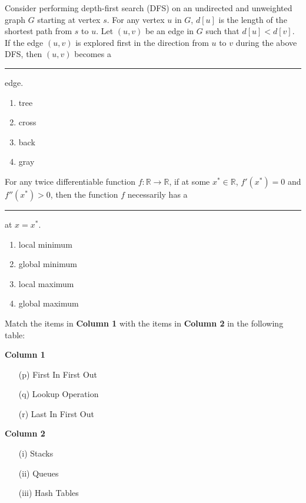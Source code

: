 \iffalse
\chapter{2024}
\author{AI24BTECH11012}
\section{da}
\fi
	\item Consider performing depth-first search (DFS) on an undirected and unweighted graph $G$ starting at vertex $s$. For any vertex $u$ in $G$, $d[u]$ is the length of the shortest path from $s$ to $u$. Let $(u,v)$ be an edge in $G$ such that $d[u]<d[v]$. If the edge $(u,v)$ is explored first in the direction from $u$ to $v$ during the above DFS, then $(u,v)$ becomes a \rule{1.5cm}{0.4pt}edge.
	\begin{enumerate}
	\item tree
	\item cross
	\item back
	\item gray
	\end{enumerate}

\item For any twice differentiable function $ f : \mathbb{R} \to \mathbb{R} $, if at some $ x^* \in \mathbb{R} $, $ f'(x^*) = 0 $ and $ f''(x^*) > 0 $, then the function $ f $ necessarily has a \rule{1.5cm}{0.4pt} at $ x = x^* $.

\begin{enumerate}
    \item local minimum
    \item global minimum
    \item local maximum
    \item global maximum
\end{enumerate}

\item Match the items in \textbf{Column 1} with the items in \textbf{Column 2} in the following table:

\begin{multicols}{2}
\textbf{Column 1}
\begin{enumerate}
    \item[(p)] First In First Out
    \item[(q)] Lookup Operation
    \item[(r)] Last In First Out
\end{enumerate}

\columnbreak

\textbf{Column 2}
\begin{enumerate}
    \item[(i)] Stacks
    \item[(ii)] Queues
    \item[(iii)] Hash Tables
\end{enumerate}
\end{multicols}

